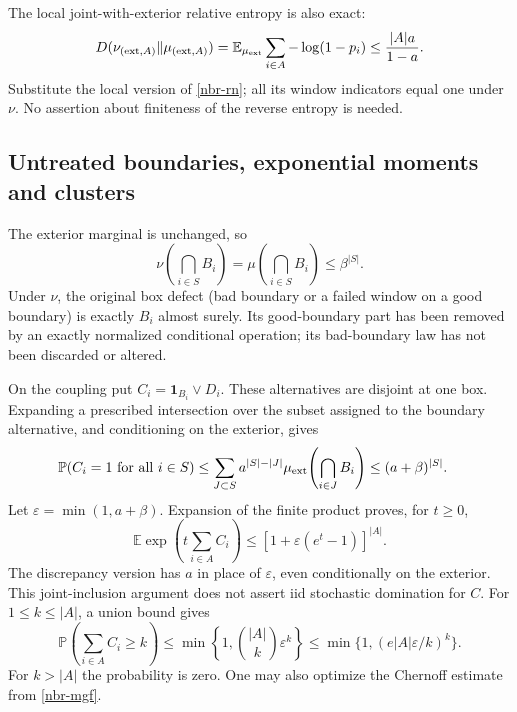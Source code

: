\documentclass[11pt]{article}
\theoremstyle{remark}
\begin{document}
The local joint-with-exterior relative entropy is also exact:
\begin{equation}
 D(\nu_{({\rm ext},A)}\|\mu_{({\rm ext},A)})
 =\mathbb E_{\mu_{\rm ext}}\sum_{i\in A}-\log(1-p_i)
 \le\frac{|A|a}{1-a}.
 \label{nbr-entropy}
\end{equation}
Substitute the local version of \eqref{nbr-rn}; all its window
indicators equal one under \(\nu\). No assertion about finiteness of
the reverse entropy is needed.

\subsection{Untreated boundaries, exponential moments and clusters}
\label{nbr-sparsity-section}

The exterior marginal is unchanged, so
\begin{equation}
 \nu\!\left(\bigcap_{i\in S}B_i\right)
 =\mu\!\left(\bigcap_{i\in S}B_i\right)\le\beta^{|S|}.
 \label{nbr-retained-boundaries}
\end{equation}
Under \(\nu\), the original box defect (bad boundary or a failed window
on a good boundary) is exactly \(B_i\) almost surely. Its good-boundary
part has been removed by an exactly normalized conditional operation;
its bad-boundary law has not been discarded or altered.

On the coupling put \(C_i=\mathbf1_{B_i}\lor D_i\). These alternatives
are disjoint at one box. Expanding a prescribed intersection over the
subset assigned to the boundary alternative, and conditioning on the
exterior, gives
\begin{align}
 \mathbb P(C_i=1\text{ for all }i\in S)
 &\le\sum_{J\subset S}a^{|S|-|J|}
       \mu_{\rm ext}\!\left(\bigcap_{i\in J}B_i\right)
 \le(a+\beta)^{|S|}.
 \label{nbr-combined-joint}
\end{align}
Let \(\varepsilon=\min(1,a+\beta)\).
Expansion of the finite product proves, for \(t\ge0\),
\begin{equation}
 \mathbb E\exp\left(t\sum_{i\in A}C_i\right)
 \le[1+\varepsilon(e^t-1)]^{|A|}.
 \label{nbr-mgf}
\end{equation}
The discrepancy version has \(a\) in place of \(\varepsilon\), even
conditionally on the exterior. This joint-inclusion argument does not
assert iid stochastic domination for \(C\).
For \(1\le k\le|A|\), a union bound gives
\begin{equation}
 \mathbb P\!\left(\sum_{i\in A}C_i\ge k\right)
 \le\min\left\{1,\binom{|A|}{k}\varepsilon^k\right\}
 \le\min\{1,(e|A|\varepsilon/k)^k\}.
 \label{nbr-count-tail}
\end{equation}
For \(k>|A|\) the probability is zero. One may also optimize the
Chernoff estimate from \eqref{nbr-mgf}.
\end{document}
